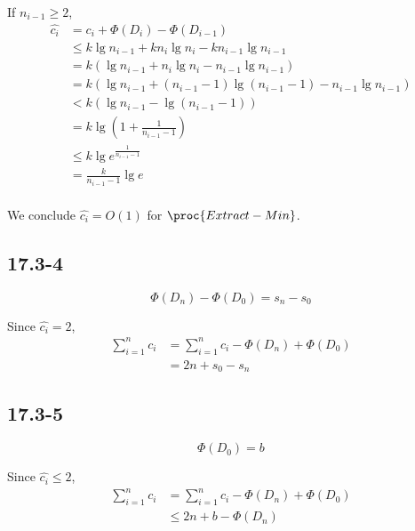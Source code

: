 If $n_{i-1} \geq 2$,
\begin{equation*}
\begin{split}
    \hat{c_i} & = c_i + \Phi(D_i) - \Phi(D_{i - 1}) \\
    & \leq k \lg n_{i-1} + k n_i \lg n_i - k n_{i-1} \lg n_{i-1} \\
    & = k (\lg n_{i-1} + n_i \lg n_i - n_{i-1} \lg n_{i-1}) \\
    & = k (\lg n_{i-1} + (n_{i-1} - 1) \lg (n_{i-1} - 1) - n_{i-1} \lg n_{i-1}) \\
    & < k (\lg n_{i-1} - \lg (n_{i-1} - 1)) \\
    & = k \lg (1 + \frac{1}{n_{i-1} - 1}) \\
    & \leq k \lg e^{\frac{1}{n_{i-1} - 1}} \\
    & = \frac{k}{n_{i-1} - 1} \lg e \\
\end{split}
\end{equation*}

We conclude $\hat{c_i} = O(1)$ for $\proc{Extract-Min}$.

\subsection*{17.3-4}

\begin{equation*}
    \Phi(D_{n}) - \Phi(D_{0}) = s_n - s_0
\end{equation*}

Since $\hat{c_i} = 2$,
\begin{equation*}
\begin{split}
    \sum\limits_{i = 1}^n c_i
    & = \sum\limits_{i = 1}^n \hat{c_i}
    - \Phi(D_{n}) + \Phi(D_{0}) \\
    & = 2n + s_0 - s_n
\end{split}
\end{equation*}

\subsection*{17.3-5}

\begin{equation*}
    \Phi(D_0) = b
\end{equation*}

Since $\hat{c_i} \leq 2$,
\begin{equation*}
\begin{split}
    \sum\limits_{i = 1}^n c_i
    & = \sum\limits_{i = 1}^n \hat{c_i}
    - \Phi(D_{n}) + \Phi(D_{0}) \\
    & \leq 2n + b - \Phi(D_{n})
\end{split}
\end{equation*}


